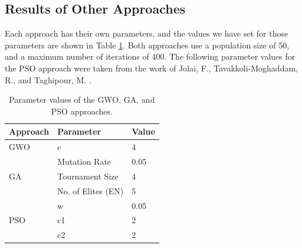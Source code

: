 \subsection{Results of Other Approaches}
Each approach has their own parameters, and the values we have set for those parameters are shown in Table \ref{approach-parameters}. Both approaches use a population size of 50, and a maximum number of iterations of 400. The following parameter values for the PSO approach were taken from the work of Jolai, F., Tavakkoli-Moghaddam, R., and Taghipour, M. \cite{Jolai2012}.

\begin{table}[h!]
	\centering
	\begin{tabular}{|l|l|l|}
		\hline
		\textbf{Approach}   & \textbf{Parameter} & \textbf{Value} \\ \hline
		GWO                 & c                  & 4              \\ \hline
		\multirow{3}{*}{GA} & Mutation Rate      & 0.05           \\ \cline{2-3} 
		& Tournament Size    & 4              \\ \cline{2-3} 
		& No. of Elites (EN) & 5              \\ \hline
		\multirow{3}{*}{PSO} & w      & 0.05           \\ \cline{2-3} 
		& c1    & 2              \\ \cline{2-3} 
		& c2 	& 2              \\ \hline
	\end{tabular}
	\caption{Parameter values of the GWO, GA, and PSO approaches.}
	\label{approach-parameters}
\end{table}

